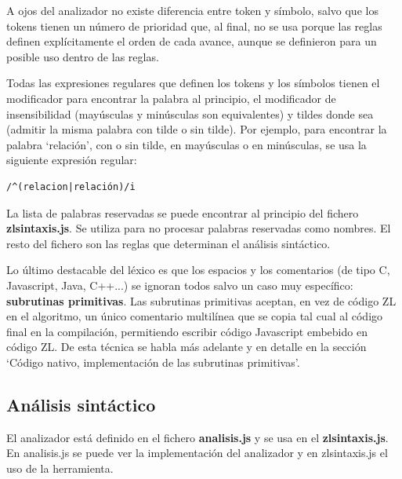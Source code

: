 \documentclass{report}
\begin{document}
	\vspace{10px}
	
	A ojos del analizador no existe diferencia entre token y símbolo, salvo que los tokens tienen un número de prioridad que, al final, no se usa porque las reglas definen explícitamente el orden de cada avance, aunque se definieron para un posible uso dentro de las reglas. 

	\vspace{10px}
	
	Todas las expresiones regulares que definen los tokens y los símbolos tienen el modificador para encontrar la palabra al principio, el modificador de insensibilidad (mayúsculas y minúsculas son equivalentes) y tildes donde sea (admitir la misma palabra con tilde o sin tilde). Por ejemplo, para encontrar la palabra `relación', con o sin tilde, en mayúsculas o en minúsculas, se usa la siguiente expresión regular: 
	
	\begin{BVerbatim}
/^(relacion|relación)/i
	\end{BVerbatim}

	\vspace{10px}
	
	La lista de palabras reservadas se puede encontrar al principio del fichero \textbf{zlsintaxis.js}. Se utiliza para no procesar palabras reservadas como nombres. El resto del fichero son las reglas que determinan el análisis sintáctico.
	
	\vspace{10px}
	
	Lo último destacable del léxico es que los espacios y los comentarios (de tipo C, Javascript, Java, C++...) se ignoran todos salvo un caso muy específico: \textbf{subrutinas primitivas}. Las subrutinas primitivas aceptan, en vez de código ZL en el algoritmo, un único comentario multilínea que se copia tal cual al código final en la compilación, permitiendo escribir código Javascript embebido en código ZL. De esta técnica se habla más adelante y en detalle en la sección `Código nativo, implementación de las subrutinas primitivas'.
	
	\subsection{Análisis sintáctico}
	
	El analizador está definido en el fichero \textbf{analisis.js} y se usa en el \textbf{zlsintaxis.js}. En analisis.js se puede ver la implementación del analizador y en zlsintaxis.js el uso de la herramienta.
	
\end{document}
